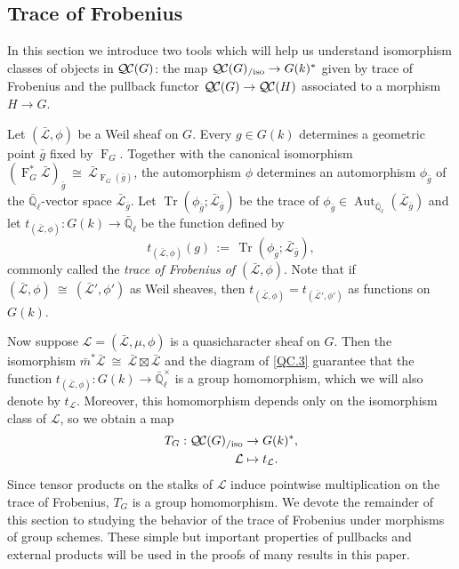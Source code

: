 \documentclass[10pt]{amsart}
\theoremstyle{plain}
\theoremstyle{definition}
\theoremstyle{remark}
\newcommand{\EE}{\mathbb{\bar Q}_\ell}
\newcommand{\Fq}{k}
\newcommand{\EEx}{\EE^\times}
\newcommand{\Frob}[1]{\operatorname{F}_{#1}}
\DeclareMathOperator{\Aut}{Aut}
\DeclareMathOperator{\trace}{Tr}
\newcommand{\ceq}{{\, :=\, }}
\newcommand{\iso}{{\ \cong\ }}
\newcommand{\trFrob}[1]{t_{#1}}
\newcommand{\TrFrob}[1]{T_{#1}}
\newcommand{\qcs}[1]{{\mathcal{#1}}}
\newcommand{\gqcs}[1]{{\mathcal{\bar #1}}}
\newcommand{\QC}{{\mathcal{Q\hskip-0.8pt C}}}
\newcommand{\QCiso}[1]{\QC(#1)_{/\text{iso}}}
\newcommand{\bg}{\bar{g}}
\newcommand{\bm}{\bar{m}}
\begin{document}
\subsection{Trace of Frobenius}\label{ssec:Frob}

In this section we introduce two tools which will help us understand isomorphism classes of objects in $\QC(G)$: the map $\QCiso{G} \to G(k)^*$ given by trace of Frobenius and the pullback functor $\QC(G) \to \QC(H)$ associated to a morphism $H \to G$.

Let $(\gqcs{L},\phi)$ be a Weil sheaf on $G$. Every $g\in G(\Fq)$
determines a geometric point $\bg$ fixed by $\Frob{G}$. 
Together with the canonical isomorphism $(\Frob{G}^*\gqcs{L})_{\bg} \iso  \gqcs{L}_{\Frob{G}(\bg)}$, the automorphism $\phi$ determines an automorphism $\phi_{\bg}$ of the $\EE$-vector space $\gqcs{L}_{\bg}$.
Let $\trace(\phi_{\bg};\gqcs{L}_{\bg})$ be the trace of $\phi_{\bg} \in \Aut_{\EE}(\gqcs{L}_{\bg})$ and let $\trFrob{(\gqcs{L},\phi)} : G(\Fq)\to \EE$ be the function defined by 
\begin{equation}\label{trWeil}
\trFrob{(\gqcs{L},\phi)}(g) \ceq \trace(\phi_{\bg};\gqcs{L}_{\bg}),
\end{equation}
commonly called the {\em trace of Frobenius of $(\gqcs{L},\phi)$}.
Note that if $(\gqcs{L},\phi) \iso (\gqcs{L'},\phi')$ as Weil sheaves, 
then $\trFrob{(\gqcs{L},\phi)} = \trFrob{(\gqcs{L'},\phi')}$ as functions on $G(\Fq)$.

Now suppose $\qcs{L} = (\gqcs{L},\mu,\phi)$ is a quasicharacter sheaf on $G$.
Then the isomorphism $\bm^* \gqcs{L} \iso \gqcs{L} \boxtimes\gqcs{L}$ and the diagram of
\ref{QC.3} guarantee
that the function $\trFrob{(\gqcs{L},\phi)} : G(\Fq)\to \EEx$ is a group homomorphism, which we will also denote by $\trFrob{\qcs{L}}$.  Moreover,
this homomorphism depends only on the isomorphism class of $\qcs{L}$, so we obtain a map
\begin{align*}
\TrFrob{G} : \QCiso{G} &\to G(\Fq)^*, \\
\qcs{L} &\mapsto \trFrob{\qcs{L}}.
\end{align*}
Since tensor products on the stalks of $\qcs{L}$ induce pointwise multiplication on the trace of Frobenius, $\TrFrob{G}$ is a group homomorphism.  We devote the remainder of this section to
studying the behavior of the trace of Frobenius under morphisms of group schemes.  These simple but important
properties of pullbacks and external products will be used in the proofs of many results in this paper.
\end{document}
